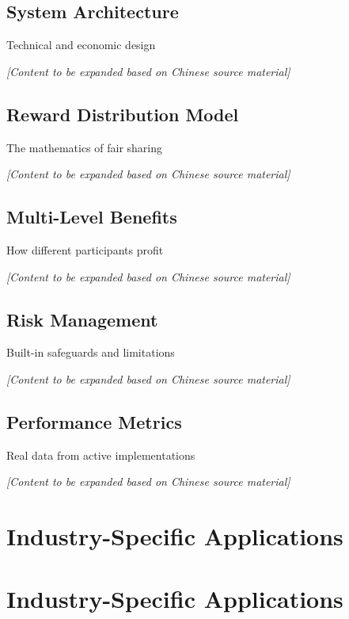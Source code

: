 \documentclass[
  Letterpaper,
]{scrbook}
\begin{document}
\section{System Architecture}\label{system-architecture}

Technical and economic design

\emph{{[}Content to be expanded based on Chinese source material{]}}

\section{Reward Distribution Model}\label{reward-distribution-model}

The mathematics of fair sharing

\emph{{[}Content to be expanded based on Chinese source material{]}}

\section{Multi-Level Benefits}\label{multi-level-benefits}

How different participants profit

\emph{{[}Content to be expanded based on Chinese source material{]}}

\section{Risk Management}\label{risk-management}

Built-in safeguards and limitations

\emph{{[}Content to be expanded based on Chinese source material{]}}

\section{Performance Metrics}\label{performance-metrics}

Real data from active implementations

\emph{{[}Content to be expanded based on Chinese source material{]}}

\chapter{Industry-Specific
Applications}\label{industry-specific-applications}

\chapter{Industry-Specific
Applications}\label{sec-industry-applications}
\end{document}
